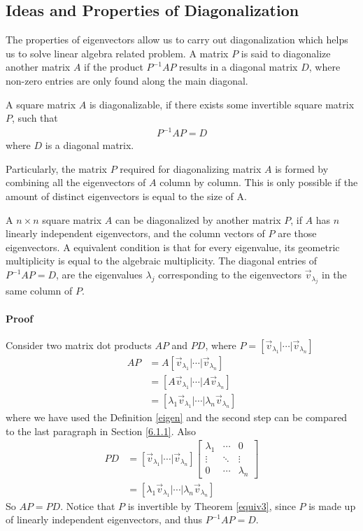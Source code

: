 \subsection{Ideas and Properties of Diagonalization}
The properties of eigenvectors allow us to carry out diagonalization which helps us to solve linear algebra related problem. A matrix $P$ is said to diagonalize another matrix $A$ if the product $P^{-1}AP$ results in a diagonal matrix $D$, where non-zero entries are only found along the main diagonal.
\begin{defn}
A square matrix $A$ is diagonalizable, if there exists some invertible square matrix $P$, such that
\begin{align*}
P^{-1}AP = D
\end{align*}
where $D$ is a diagonal matrix.
\end{defn}
Particularly, the matrix $P$ required for diagonalizing matrix $A$ is formed by combining all the eigenvectors of $A$ column by column. This is only possible if the amount of distinct eigenvectors is equal to the size of A.
\begin{proper}
\label{diagonalize}
A $n \times n$ square matrix $A$ can be diagonalized by another matrix $P$, if $A$ has $n$ linearly independent eigenvectors, and the column vectors of $P$ are those eigenvectors. A equivalent condition is that for every eigenvalue, its geometric multiplicity is equal to the algebraic multiplicity. The diagonal entries of $P^{-1}AP = D$, are the eigenvalues $\lambda_j$ corresponding to the eigenvectors $\vec{v}_{\lambda_j}$ in the same column of $P$. 
\paragraph{Proof}
Consider two matrix dot products $AP$ and $PD$, where $P = [\vec{v}_{\lambda_1}|\cdots|\vec{v}_{\lambda_n}]$
\begin{align*}
AP &= A[\vec{v}_{\lambda_1}|\cdots|\vec{v}_{\lambda_n}] \\
&= [A\vec{v}_{\lambda_1}|\cdots|A\vec{v}_{\lambda_n}] \\
&= [\lambda_1\vec{v}_{\lambda_1}|\cdots|\lambda_n \vec{v}_{\lambda_n}]
\end{align*}
where we have used the Definition \ref{eigen} and the second step can be compared to the last paragraph in Section \ref{6.1.1}. Also
\begin{align*}
PD &= [\vec{v}_{\lambda_1}|\cdots|\vec{v}_{\lambda_n}]
\begin{bmatrix}
\lambda_1 & \cdots & 0 \\
\vdots & \ddots & \vdots \\
0 & \cdots & \lambda_n
\end{bmatrix} \\
&= [\lambda_1\vec{v}_{\lambda_1}|\cdots|\lambda_n \vec{v}_{\lambda_n}]
\end{align*}
So $AP = PD$. Notice that $P$ is invertible by Theorem \ref{equiv3}, since $P$ is made up of linearly independent eigenvectors, and thus $P^{-1}AP = D$.
\end{proper}

